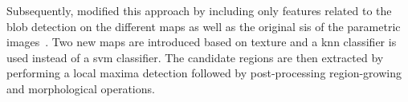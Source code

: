 Subsequently, \citeauthor{Litjens2012} modified this approach by including only features related to the blob detection on the different maps as well as the original \acp{si} of the parametric images~\cite{Litjens2012}.
Two new maps are introduced based on texture and a \ac{knn} classifier is used instead of a \ac{svm} classifier.
The candidate regions are then extracted by performing a local maxima detection followed by post-processing region-growing and morphological operations. 
